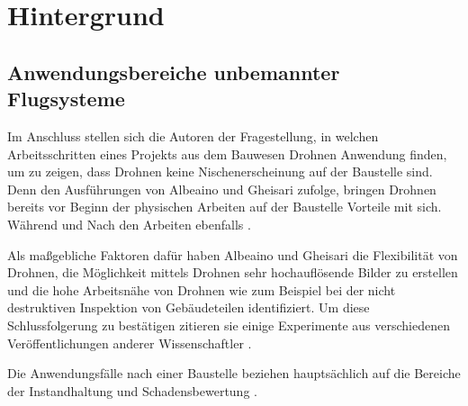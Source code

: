 
\section{Hintergrund}
\subsection{Anwendungsbereiche unbemannter Flugsysteme}
Im Anschluss stellen sich die Autoren der Fragestellung, in welchen Arbeitsschritten eines Projekts aus dem Bauwesen Drohnen Anwendung finden, um zu zeigen, dass Drohnen keine Nischenerscheinung auf der Baustelle sind.
Denn den Ausführungen von Albeaino und Gheisari zufolge, bringen Drohnen bereits vor Beginn der physischen Arbeiten auf der Baustelle Vorteile mit sich.
Während und Nach den Arbeiten ebenfalls \cite[S. 86]{abaeano2021trends}.

Als maßgebliche Faktoren dafür haben Albeaino und Gheisari die Flexibilität von Drohnen, die Möglichkeit mittels Drohnen sehr hochauflösende Bilder zu erstellen und die hohe Arbeitsnähe von Drohnen wie zum Beispiel bei der nicht destruktiven Inspektion von Gebäudeteilen identifiziert.
Um diese Schlussfolgerung zu bestätigen zitieren sie einige Experimente aus verschiedenen Veröffentlichungen anderer Wissenschaftler \cite[S. 87--88]{abaeano2021trends}.

Die Anwendungsfälle nach einer Baustelle beziehen hauptsächlich auf die Bereiche der Instandhaltung und Schadensbewertung \cite[S. 89]{abaeano2021trends}.



